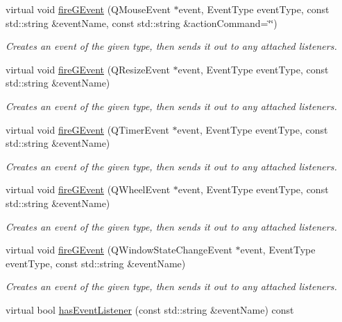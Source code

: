 \begin{DoxyCompactItemize}
virtual void \mbox{\hyperlink{classGObservable_a119318675d2165bdf7dd853aaf881d4b}{fire\+G\+Event}} (Q\+Mouse\+Event $\ast$event, Event\+Type event\+Type, const std\+::string \&event\+Name, const std\+::string \&action\+Command=\char`\"{}\char`\"{})
\begin{DoxyCompactList}\small\item\em Creates an event of the given type, then sends it out to any attached listeners. \end{DoxyCompactList}\item 
virtual void \mbox{\hyperlink{classGObservable_a63fd9034e1e1633c1c38eb342bfd34e9}{fire\+G\+Event}} (Q\+Resize\+Event $\ast$event, Event\+Type event\+Type, const std\+::string \&event\+Name)
\begin{DoxyCompactList}\small\item\em Creates an event of the given type, then sends it out to any attached listeners. \end{DoxyCompactList}\item 
virtual void \mbox{\hyperlink{classGObservable_a741345310d9b7c5170a6cbc410c44ac4}{fire\+G\+Event}} (Q\+Timer\+Event $\ast$event, Event\+Type event\+Type, const std\+::string \&event\+Name)
\begin{DoxyCompactList}\small\item\em Creates an event of the given type, then sends it out to any attached listeners. \end{DoxyCompactList}\item 
virtual void \mbox{\hyperlink{classGObservable_a93bf338968a0338761b8e4dc62f582e9}{fire\+G\+Event}} (Q\+Wheel\+Event $\ast$event, Event\+Type event\+Type, const std\+::string \&event\+Name)
\begin{DoxyCompactList}\small\item\em Creates an event of the given type, then sends it out to any attached listeners. \end{DoxyCompactList}\item 
virtual void \mbox{\hyperlink{classGObservable_a2a70a7d7435ff0c3b80bb4d70da19e0d}{fire\+G\+Event}} (Q\+Window\+State\+Change\+Event $\ast$event, Event\+Type event\+Type, const std\+::string \&event\+Name)
\begin{DoxyCompactList}\small\item\em Creates an event of the given type, then sends it out to any attached listeners. \end{DoxyCompactList}\item 
virtual bool \mbox{\hyperlink{classGObservable_a9f6faaa25942923bafa1c44020c49fa9}{has\+Event\+Listener}} (const std\+::string \&event\+Name) const

\end{DoxyCompactItemize}
